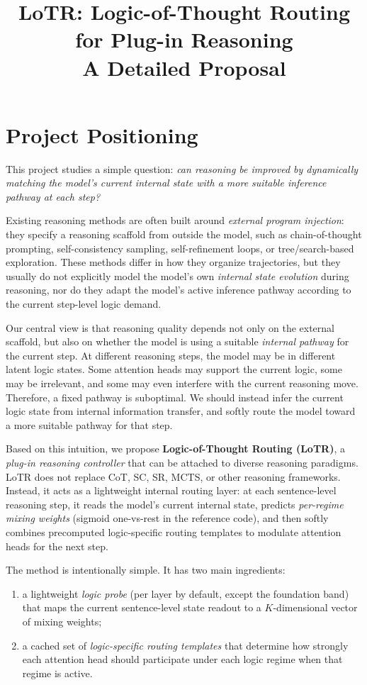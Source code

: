 \documentclass[11pt]{article}
\title{\textbf{LoTR: Logic-of-Thought Routing for Plug-in Reasoning}\\
\vspace{0.3em}
\large A Detailed Proposal}
\author{}
\date{}
\begin{document}
\maketitle

\section{Project Positioning}

This project studies a simple question: \emph{can reasoning be improved by dynamically matching the model's current internal state with a more suitable inference pathway at each step?}

Existing reasoning methods are often built around \emph{external program injection}: they specify a reasoning scaffold from outside the model, such as chain-of-thought prompting, self-consistency sampling, self-refinement loops, or tree/search-based exploration. These methods differ in how they organize trajectories, but they usually do not explicitly model the model's own \emph{internal state evolution} during reasoning, nor do they adapt the model's active inference pathway according to the current step-level logic demand.

Our central view is that reasoning quality depends not only on the external scaffold, but also on whether the model is using a suitable \emph{internal pathway} for the current step. At different reasoning steps, the model may be in different latent logic states. Some attention heads may support the current logic, some may be irrelevant, and some may even interfere with the current reasoning move. Therefore, a fixed pathway is suboptimal. We should instead infer the current logic state from internal information transfer, and softly route the model toward a more suitable pathway for that step.

Based on this intuition, we propose \textbf{Logic-of-Thought Routing (LoTR)}, a \emph{plug-in reasoning controller} that can be attached to diverse reasoning paradigms. LoTR does not replace CoT, SC, SR, MCTS, or other reasoning frameworks. Instead, it acts as a lightweight internal routing layer: at each sentence-level reasoning step, it reads the model's current internal state, predicts \emph{per-regime mixing weights} (sigmoid one-vs-rest in the reference code), and then softly combines precomputed logic-specific routing templates to modulate attention heads for the next step.

The method is intentionally simple. It has two main ingredients:
\begin{enumerate}[leftmargin=1.5em]
    \item a lightweight \emph{logic probe} (per layer by default, except the foundation band) that maps the current sentence-level state readout to a $K$-dimensional vector of mixing weights;
    \item a cached set of \emph{logic-specific routing templates} that determine how strongly each attention head should participate under each logic regime when that regime is active.
\end{enumerate}
\end{document}
